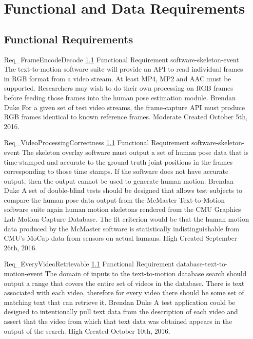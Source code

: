 \documentclass{scrreprt}
\begin{document}
\section{Functional and Data Requirements}

\subsection{Functional Requirements}
\label{req-functional-requirement}

\requirement
{Req_FrameEncodeDecode}
{\ref{req-functional-requirement} Functional Requirement}
{software-skeleton-event}
{The text-to-motion software suite will provide an API to read individual
 frames in RGB format from a video stream. At least MP4, MP2 and AAC must be
 supported.}
{Researchers may wish to do their own processing on RGB frames before feeding
 those frames into the human pose estimation module.}
{Brendan Duke}
{For a given set of test video streams, the frame-capture API must produce RGB
 frames identical to known reference frames.}
{Moderate}
{Created October 5th, 2016.}

\requirement
{Req_VideoProcessingCorrectness}
{\ref{req-functional-requirement} Functional Requirement}
{software-skeleton-event}
{The skeleton overlay software must output a set of human pose data that is
 time-stamped and accurate to the ground truth joint positions in the frames
 corresponding to those time stamps.}
{If the software does not have accurate output, then the output cannot be used
 to generate human motion.}
{Brendan Duke}
{A set of double-blind tests should be designed that allows test subjects to
 compare the human pose data output from the McMaster Text-to-Motion software
 suite again human motion skeletons rendered from the CMU Graphics Lab Motion
 Capture Database. The fit criterion would be that the human motion data
 produced by the McMaster software is statistically indistinguishable from
 CMU's MoCap data from sensors on actual humans.}
{High}
{Created September 26th, 2016.}

\requirement
{Req_EveryVideoRetrievable}
{\ref{req-functional-requirement} Functional Requirement}
{database-text-to-motion-event}
{The domain of inputs to the text-to-motion database search should output a
 range that covers the entire set of videos in the database.}
{There is text associated with each video, therefore for every video there
 should be some set of matching text that can retrieve it.}
{Brendan Duke}
{A test application could be designed to intentionally pull text data from the
 description of each video and assert that the video from which that text data
 was obtained appears in the output of the search.}
{High}
{Created October 10th, 2016.}
\end{document}
